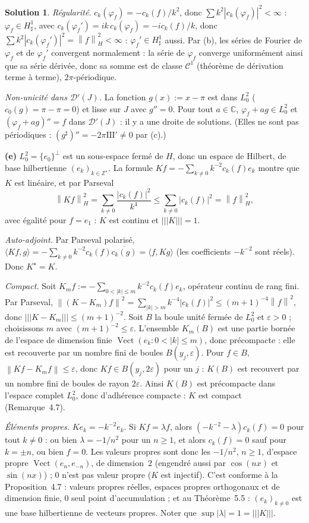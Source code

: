 \documentclass[11pt,a4paper]{article}
\newcommand{\Z}{\mathbb{Z}}
\newcommand{\C}{\mathbb{C}}
\newcommand{\Vect}{\operatorname{Vect}}
\newcommand{\norm}[1]{\left\|#1\right\|}
\newcommand{\opnorm}[1]{|\!|\!|#1|\!|\!|}
\newcommand{\D}{\mathcal{D}}
\newcommand{\Sha}{\mathrm{III}}
\theoremstyle{definition}
\newtheorem*{solution}{Solution}
\begin{document}
\begin{solution}
\emph{Régularité.} $c_k(\varphi_f)=-c_k(f)/k^2$, donc $\sum k^2|c_k(\varphi_f)|^2<\infty$ : $\varphi_f\in H^1_\sharp$, avec $c_k(\varphi_f')=ik\,c_k(\varphi_f)=-ic_k(f)/k$, donc $\sum k^2|c_k(\varphi_f')|^2=\norm f^2_H<\infty$ : $\varphi_f'\in H^1_\sharp$ aussi. Par (b), les séries de Fourier de $\varphi_f$ et de $\varphi_f'$ convergent normalement : la série de $\varphi_f$ converge uniformément ainsi que sa série dérivée, donc sa somme est de classe $\mathcal C^1$ (théorème de dérivation terme à terme), $2\pi$-périodique.

\emph{Non-unicité dans $\D'(J)$.} La fonction $g(x):=x-\pi$ est dans $L^2_0$ ($c_0(g)=\pi-\pi=0$) et lisse sur $J$ avec $g''=0$. Pour tout $a\in\C$, $\varphi_f+ag\in L^2_0$ et $(\varphi_f+ag)''=f$ dans $\D'(J)$ : il y a une droite de solutions. (Elles ne sont pas périodiques : $(g^\sharp)''=-2\pi\Sha'\ne0$ par (c).)

\medskip
\noindent\textbf{(e)} $L^2_0=\{e_0\}^\perp$ est un sous-espace fermé de $H$, donc un espace de Hilbert, de base hilbertienne $(e_k)_{k\in\Z^\star}$. La formule $Kf=-\sum_{k\ne0}k^{-2}c_k(f)e_k$ montre que $K$ est linéaire, et par Parseval
\[
\norm{Kf}_H^2=\sum_{k\ne0}\frac{|c_k(f)|^2}{k^4}\le\sum_{k\ne0}|c_k(f)|^2=\norm f_H^2 ,
\]
avec égalité pour $f=e_1$ : $K$ est continu et $\opnorm K=1$.

\emph{Auto-adjoint.} Par Parseval polarisé, $\langle Kf,g\rangle=-\sum_{k\ne0}k^{-2}c_k(f)\overline{c_k(g)}=\langle f,Kg\rangle$ (les coefficients $-k^{-2}$ sont réels). Donc $K^\star=K$.

\emph{Compact.} Soit $K_mf:=-\sum_{0<|k|\le m}k^{-2}c_k(f)e_k$, opérateur continu de rang fini. Par Parseval, $\norm{(K-K_m)f}^2=\sum_{|k|>m}k^{-4}|c_k(f)|^2\le(m+1)^{-4}\norm f^2$, donc $\opnorm{K-K_m}\le(m+1)^{-2}$. Soit $B$ la boule unité fermée de $L^2_0$ et $\varepsilon>0$ ; choisissons $m$ avec $(m+1)^{-2}\le\varepsilon$. L'ensemble $K_m(B)$ est une partie bornée de l'espace de dimension finie $\Vect(e_k:0<|k|\le m)$, donc précompacte : elle est recouverte par un nombre fini de boules $B(y_j,\varepsilon)$. Pour $f\in B$, $\norm{Kf-K_mf}\le\varepsilon$, donc $Kf\in B(y_j,2\varepsilon)$ pour un $j$ : $K(B)$ est recouvert par un nombre fini de boules de rayon $2\varepsilon$. Ainsi $K(B)$ est précompacte dans l'espace complet $L^2_0$, donc d'adhérence compacte : $K$ est compact (Remarque~4.7).

\emph{Éléments propres.} $Ke_k=-k^{-2}e_k$. Si $Kf=\lambda f$, alors $(-k^{-2}-\lambda)c_k(f)=0$ pour tout $k\ne0$ : ou bien $\lambda=-1/n^2$ pour un $n\ge1$, et alors $c_k(f)=0$ sauf pour $k=\pm n$, ou bien $f=0$. Les valeurs propres sont donc les $-1/n^2$, $n\ge1$, d'espace propre $\Vect(e_n,e_{-n})$, de dimension~$2$ (engendré aussi par $\cos(nx)$ et $\sin(nx)$) ; $0$ n'est pas valeur propre ($K$ est injectif). C'est conforme à la Proposition~4.7 : valeurs propres réelles, espaces propres orthogonaux et de dimension finie, $0$ seul point d'accumulation ; et au Théorème~5.5 : $(e_k)_{k\ne0}$ est une base hilbertienne de vecteurs propres. Noter que $\sup|\lambda|=1=\opnorm K$.


\end{solution}
\end{document}
